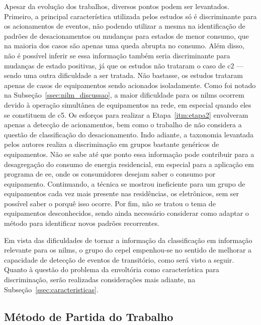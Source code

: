 Apesar da evolução dos trabalhos, diversos pontos podem ser
levantados. Primeiro, a principal característica utilizada pelos
estudos só é discriminante para os acionamentos de eventos, não
podendo utilizar a mesma na identificação de padrões de desacionamentos
ou mudanças para estados de menor consumo, que na maioria dos casos
são apenas uma queda abrupta no consumo.  Além disso, não é possível
inferir se essa informação também seria discriminante para mudanças de
estado positivas, já que os estudos não trataram o caso de \gls{c2}
--- sendo uma outra dificuldade a ser tratada. Não bastasse, os
estudos trataram apenas de casos de equipamentos sendo acionados
isoladamente. Como foi notado na Subseção~\ref{ssec:nilm_discussao},
a maior dificuldade para os \glspl{nilm} ocorrem devido à
operação simultânea de equipamentos na rede, em especial quando eles
se constituem de \gls{c5}. Os esforços para realizar a
Etapa~\ref{itm:etapa2} envolveram apenas a detecção de acionamentos,
bem como o trabalho de \cite{nilm_cepel_alvaro} não considera a
questão de classificação do desacionamento. Indo adiante, a taxonomia
levantada pelos autores realiza a discriminação em grupos bastante
genéricos de equipamentos.  Não se sabe até que ponto essa informação
pode contribuir para a desagregação do consumo de energia residencial,
em especial para a aplicação em programa de \gls{ee}, onde os
consumidores desejam saber o consumo por equipamento. Continuando, a
técnica se mostrou ineficiente para um grupo de equipamentos cada vez
mais presente nas residências, os eletrônicos, sem ser possível saber
o porquê isso ocorre. Por fim, não se tratou o tema de equipamentos
desconhecidos, sendo ainda necessário considerar como adaptar o método
para identificar novos padrões recorrentes.

Em vista das dificuldades de tornar a informação da classificação em
informação relevante para os \glspl{nilm}, o grupo do \gls{cepel}
empenhou-se no sentido de melhorar a capacidade de detecção de eventos
de transitório, como será visto a seguir. Quanto à questão do
problema da envoltória como característica para discriminação, serão
realizadas considerações mais adiante, na
Subseção~\ref{ssec:caracteristicas}.

\subsection{Método de Partida do Trabalho}%
\label{ssec:met_cepel}

